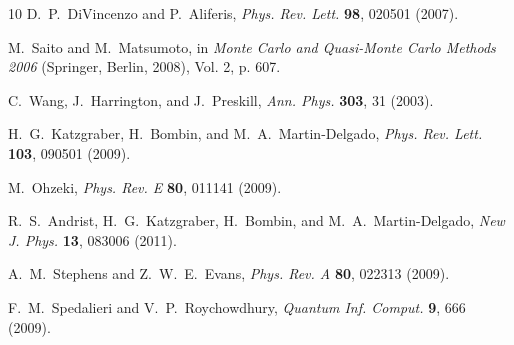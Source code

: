 \documentclass[letterpaper,showpacs,superscriptaddress,twocolumn,aps,prl]{revtex4-1}
\begin{document}
\begin{thebibliography}{10}
D.~P.~DiVincenzo and P.~Aliferis, {\it Phys. Rev. Lett.} {\bf 98}, 020501 (2007).

M.~Saito and M.~Matsumoto, in {\it Monte Carlo and Quasi-Monte Carlo Methods 2006} (Springer, Berlin, 2008), Vol. 2, p. 607.

C.~Wang, J.~Harrington, and J.~Preskill, {\it Ann. Phys.} {\bf 303}, 31  (2003).

H.~G.~Katzgraber, H.~Bombin, and M.~A.~Martin-Delgado, {\it Phys. Rev. Lett.} {\bf 103}, 090501 (2009).

M.~Ohzeki, {\it Phys. Rev. E} {\bf 80}, 011141 (2009).

R.~S.~Andrist, H.~G.~Katzgraber, H.~Bombin, and M.~A.~Martin-Delgado, {\it New J. Phys.} {\bf 13}, 083006 (2011).

A.~M.~Stephens and Z.~W.~E.~Evans, {\it Phys. Rev. A} \textbf{80}, 022313 (2009).

F.~M.~Spedalieri and V.~P.~Roychowdhury, {\it Quantum Inf. Comput.} \textbf{9}, 666 (2009).

\end{thebibliography}
\end{document}
